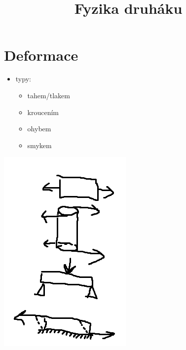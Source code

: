 \documentclass{article}
\title{\vspace{-2cm}Fyzika druháku\vspace{-1.7cm}}
\date{}
\author{}
\begin{document}
\maketitle

\part{Deformace}

  \begin{minipage}{0.25\textwidth}\raggedleft
    \begin{itemize}
      \item typy:
      \begin{itemize}
        \item tahem/tlakem
        \item kroucením
        \item ohybem
        \item smykem
      \end{itemize}
    \end{itemize}
  \end{minipage}
  \hspace{0.5cm}
  \noindent\begin{minipage}{0.12\textwidth}
    \includegraphics[width=0.9\linewidth]{deformace}
  \end{minipage}
\end{document}
